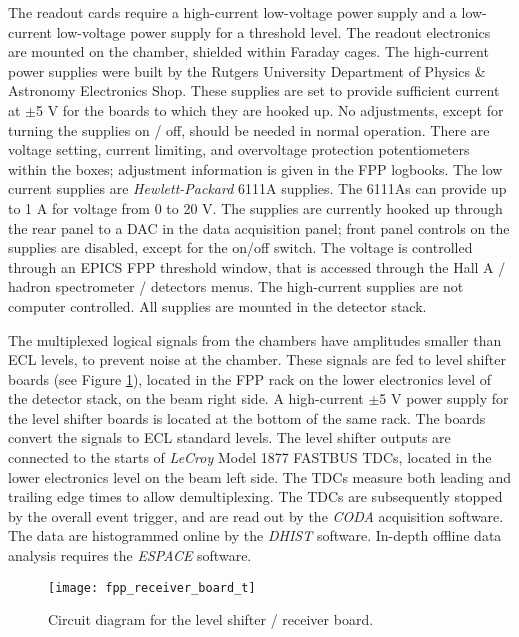 {The readout cards require a high-current low-voltage
power supply and a low-current low-voltage power
supply for a threshold level.
The readout electronics are mounted on the chamber, shielded
within Faraday cages.
The high-current power supplies were built by the Rutgers University
Department of Physics \& Astronomy Electronics Shop.
These supplies are set to provide sufficient current at $\pm$5 V for the
boards to which they are hooked up.
No adjustments, except for turning the supplies on / off, should be needed
in normal operation.
There are voltage setting, current limiting, and overvoltage protection
potentiometers within the boxes; adjustment information is given in the
FPP logbooks.
The low current supplies are {\em Hewlett-Packard} 6111A supplies.
The 6111As can provide up to 1 A for voltage from 0 to 20 V.
The supplies are currently hooked up through the rear panel to a DAC in
the data acquisition panel; front panel controls on the supplies are
disabled, except for the on/off switch.
The voltage is controlled through an EPICS FPP threshold window, that
is accessed through the Hall A / hadron spectrometer / detectors menus.
The high-current supplies are not computer controlled.
All supplies are mounted in the detector stack.

The multiplexed logical signals from the chambers have amplitudes
smaller than ECL levels, to prevent noise at the chamber.
These signals are fed to level shifter boards 
(see Figure \ref{fig:receiverboard}),
located in the FPP rack on
the lower electronics level of the detector stack, on the beam right side.
A high-current $\pm$5 V power supply for the level shifter boards is
located at the bottom of the same rack.
The boards convert the signals to ECL standard levels.
The level shifter outputs
are connected to the starts of {\em LeCroy} Model 1877 FASTBUS TDCs, located
in the lower electronics level on the beam left side.
The TDCs measure both leading and trailing edge times to allow demultiplexing.
The TDCs are subsequently stopped by the overall event trigger, and
are read out by the {\it CODA} acquisition software.
The data are histogrammed online by the {\it DHIST} software.
In-depth offline data analysis requires the {\it ESPACE} software.

\begin{figure}
\begin{center}
\texttt{[image: fpp\_receiver\_board\_t]}
{\linespread{1.}
\caption[Detectors: FPP Level Shifter Receiver Board]{Circuit diagram for the level shifter / receiver board.}
\label{fig:receiverboard}}
\end{center}
\end{figure}


}
